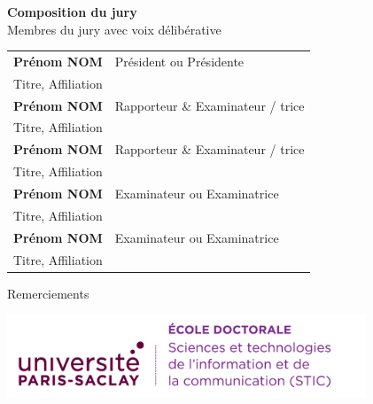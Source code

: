\documentclass[english,12pt,a4paper]{book}
\begin{document}
\begin{titlepage}
\vspace{\fill} %

\bigskip

\flushleft
\small {\color{Prune} \textbf{Composition du jury}}\\
{\color{Prune} \scriptsize {Membres du jury avec voix délibérative}} \\
\vspace{2mm}
\scriptsize
\begin{tabular}{|p{7cm}l}
\arrayrulecolor{Prune}
\textbf{Prénom NOM} &   Président ou Présidente\\
Titre, Affiliation & \\
\textbf{Prénom NOM} &  Rapporteur \& Examinateur / trice \\
Titre, Affiliation   &   \\
\textbf{Prénom NOM} &  Rapporteur \& Examinateur / trice \\
Titre, Affiliation  &   \\
\textbf{Prénom NOM} &  Examinateur ou Examinatrice \\
Titre, Affiliation   &   \\
\textbf{Prénom NOM} &  Examinateur ou Examinatrice \\
Titre, Affiliation   &   \\

\end{tabular}

\end{titlepage}

Remerciements


\thispagestyle{empty}

\noindent
\includegraphics[height=2.45cm]{ups/logo_STIC.png}
\vspace{1cm}
\end{document}
